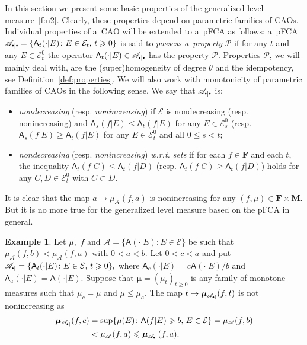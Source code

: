 \documentclass[preprint,11pt]{elsarticle}
\theoremstyle{definition}
\newtheorem{example}[tw]{Example}
\newcommand\bF{\mathbf{F}} %
\newcommand\bM{\mathbf{M}} %
\newcommand\cE{{\mathcal E}}
\newcommand\sA{\mathsf{A}}
\newcommand\aAd[3][E]{\sA_{#3}(#2|#1)}%
\newcommand\sbullet[1][.5]{\mathbin{\vcenter{\hbox{\scalebox{#1}{$\bullet$}}}}}
\newcommand\bA{\mathscr{A}}%
\newcommand\bpA{\mathscr {A}_{\sbullet|}}%
\newcommand\bpeA{\mathscr {A}_{\sbullet|\sbullet}}%
\newcommand\bE{{\mathscr {E}}}
\newcommand\mub[1][\bA]{\mu_{#1}}
\newcommand{\bmu}{\boldsymbol{\mu}}
\renewcommand\ge{\geqslant}
\renewcommand\le{\leqslant}
\begin{document}
In this section we present some basic properties of the generalized level measure~\eqref{f:n2}.  Clearly, these properties depend on  parametric families of CAOs. Individual properties of a~CAO will be extended to a~pFCA as follows: a~pFCA $\bpeA=\{\aAd{\cdot}{t}\colon E\in \cE_t, \, t\ge 0\}$ is said to \textit{possess a~property} $\mathcal{P}$ if for any $t$ and any $E\in \cE_t^0$ the operator $\aAd{\cdot}{t}\in \bpeA$ has the property $\mathcal{P}$.
Pro\-per\-ties $\mathcal{P}$, we will mainly deal with, are the (super)homogeneity of degree $\theta$ and the idempotency,
see Definition~\ref{def:properties}.
We will also work with monotonicity of parametric families of CAOs in the following sense. We say that $\bpeA$ is:
\begin{itemize}[noitemsep]
    \item  \textit{nondecreasing} (resp. \textit{nonincreasing}) if $\bE$ is nondecreasing (resp. nonincreasing) and $\sA_{s}(f|E)\le \sA_{t}(f|E)$ for any $E\in \cE_s^0$
    (resp. $\sA_{s}(f|E)\ge \sA_{t}(f|E)$ for any  $E\in \cE_{t}^0$ and  all $0\le s<t;$

    \item \textit{nondecreasing} (resp. \textit{nonincreasing}) \textit{w.r.t. sets} if for each $f\in\bF$ and each $t,$ the inequality $\aAd[C]{f}{t}\le\aAd[D]{f}{t}$  (resp. $\aAd[C]{f}{t}\ge\aAd[D]{f}{t}$) holds for any $C,D\in \cE_t^0$ with $C\subset D$.
\end{itemize}

It is clear that the map $a\mapsto\mub(f,a)$  is nonincreasing for any $(f,\mu)\in\bF\times\bM.$ But it is no more true for the generalized level measure based on the pFCA in general.

\begin{example}
Let $\mu,$ $f$  and $\bA=\{\sA(\cdot|E)\colon E\in \cE\}$ be such that $\mu_\bA(f,b)<\mu_\bA(f,a)$ with $0<a<b.$ Let $0<c<a$ and put $\bpA=\{\sA_t(\cdot|E)\colon E\in \cE,\,t\ge 0\},$ where $\sA_c(\cdot|E)=c\sA(\cdot|E)/b$ and $\sA_a(\cdot|E)=\sA(\cdot|E).$ Suppose that $\bmu=(\mu_t)_{t\ge 0}$ is any family of monotone measures such that $\mu_c=\mu$ and $\mu\le \mu _a.$
The map  $t\mapsto \bmu_{\bpA}(f,t)$ is not nonincreasing as
\begin{align*}
\bmu_{\bpA}(f,c)&=\sup\{\mu(E)\colon \sA(f|E)\ge b,\, E\in \cE\}=\mu_{\bA}(f,b)\\
&<\mu_{\bA}(f,a)\le \bmu_{\bpA}(f,a).
\end{align*}
\end{example}
\end{document}
